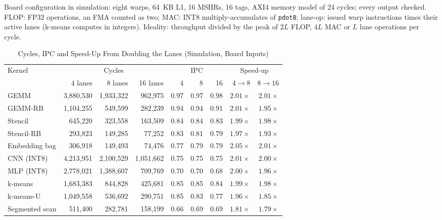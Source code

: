 \documentclass[journal]{IEEEtran}
\begin{document}
\begin{table}[t]
\vspace{2pt}
\begin{minipage}{\textwidth}\footnotesize
Board configuration in simulation: eight warps, 64~KB L1, 16 MSHRs, 16 tags, AXI4
memory model of 24 cycles; every output checked. FLOP: FP32 operations, an FMA counted
as two; MAC: INT8 multiply-accumulates of \texttt{pdot8}; lane-op: issued warp
instructions times their active lanes (k-means computes in integers). Ideality:
throughput divided by the peak of $2L$ FLOP, $4L$ MAC or $L$ lane operations per cycle.
\end{minipage}
\end{table}

\begin{table}[t]
\caption{Cycles, IPC and Speed-Up From Doubling the Lanes (Simulation, Board Inputs)}
\label{tab:lanes_cyc}
\centering\footnotesize
\setlength{\tabcolsep}{4.5pt}
\begin{tabular}{lrrrrrrrr}
\toprule
Kernel & \multicolumn{3}{c}{Cycles} & \multicolumn{3}{c}{IPC} & \multicolumn{2}{c}{Speed-up}\\
\cmidrule(lr){2-4}\cmidrule(lr){5-7}\cmidrule(lr){8-9}
 & 4 lanes & 8 lanes & 16 lanes & 4 & 8 & 16 & $4\to8$ & $8\to16$\\
\midrule
GEMM           & 3,880,530 & 1,933,322 & 962,975   & 0.97 & 0.97 & 0.98 & $2.01\times$ & $2.01\times$\\
GEMM-RB        & 1,104,255 & 549,599   & 282,239   & 0.94 & 0.94 & 0.91 & $2.01\times$ & $1.95\times$\\
Stencil        & 645,220   & 323,558   & 163,509   & 0.84 & 0.84 & 0.83 & $1.99\times$ & $1.98\times$\\
Stencil-RB     & 293,823   & 149,285   & 77,252    & 0.83 & 0.81 & 0.79 & $1.97\times$ & $1.93\times$\\
Embedding bag  & 306,918   & 149,493   & 74,476    & 0.77 & 0.79 & 0.79 & $2.05\times$ & $2.01\times$\\
CNN (INT8)     & 4,213,951 & 2,100,529 & 1,051,662 & 0.75 & 0.75 & 0.75 & $2.01\times$ & $2.00\times$\\
MLP (INT8)     & 2,778,021 & 1,388,607 & 709,769   & 0.70 & 0.70 & 0.68 & $2.00\times$ & $1.96\times$\\
k-means        & 1,683,383 & 844,828   & 425,681   & 0.85 & 0.85 & 0.84 & $1.99\times$ & $1.98\times$\\
k-means-U      & 1,049,558 & 536,692   & 290,751   & 0.85 & 0.83 & 0.77 & $1.96\times$ & $1.85\times$\\
Segmented scan & 511,400   & 282,781   & 158,199   & 0.66 & 0.69 & 0.69 & $1.81\times$ & $1.79\times$\\

\end{tabular}
\end{table}
\end{document}
